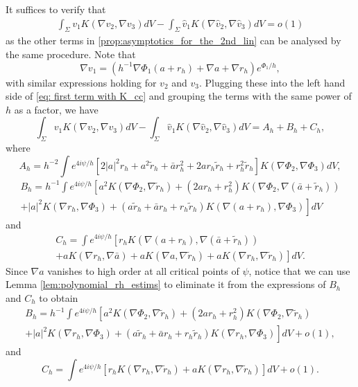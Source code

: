 \documentclass[12pt]{amsart}
\theoremstyle{definition}
\theoremstyle{remark}
\begin{document}
It suffices to verify that 
\begin{eqnarray}
\label{eq: first term with K_cc}
\int_{\Sigma}v_1K(\nabla v_2, \nabla v_3)d V - \int_{\Sigma}\hat v_1K(\nabla\hat  v_2, \nabla\hat v_3)d V = o(1)
\end{eqnarray}
as the other terms in \eqref{prop:asymptotics_for_the_2nd_lin} can be analysed by the  same procedure. Note that
\begin{equation*}
\nabla v_1=\left(h^{-1}\nabla\Phi_1(a+r_h)+\nabla a+\nabla r_h\right) e^{\Phi_1/h},
\end{equation*}
with similar expressions holding for $v_2$ and $v_3$. Plugging these into the left hand side of \eqref{eq: first term with K_cc} and grouping the terms with the same power of $h$ as a factor, we have
\begin{equation*}
\int_{\Sigma}v_1K(\nabla v_2, \nabla v_3)d V - \int_{\Sigma}\hat v_1K(\nabla\hat  v_2, \nabla\hat v_3)d V=A_h+B_h+C_h,
\end{equation*}
where
\begin{equation*}
A_h=h^{-2}\int e^{4i\psi/h}\left[ 2|a|^2 r_h+a^2\tilde r_h+\bar a r_h^2+2a r_h\tilde r_h+r_h^2\tilde r_h
  \right]K(\nabla\Phi_2,\nabla\Phi_3)d V,
\end{equation*}
\begin{multline*}
B_h=h^{-1}\int e^{4i\psi/h}\left[a^2K(\nabla\Phi_2,\nabla\tilde r_h)+(2ar_h+r_h^2)K(\nabla\Phi_2,\nabla(\bar a+\tilde r_h)) \right.\\
+\left.|a|^2K(\nabla r_h,\nabla\Phi_3)+(a\tilde r_h+\bar a r_h+r_h\tilde r_h)K(\nabla(a+r_h),\nabla\Phi_3)   \right]d V
\end{multline*}
and
\begin{multline*}
C_h=\int e^{4i\psi/h}\left[ r_h K(\nabla(a+r_h),\nabla(\bar a+\tilde r_h))\right.\\ +\left.aK(\nabla r_h,\nabla\bar a)+aK(\nabla a,\nabla\tilde r_h)+aK(\nabla r_h,\nabla\tilde r_h)  \right] dV.
\end{multline*}
Since $\nabla a$  vanishes to high order at all critical points of $\psi$, notice that we can use Lemma \ref{lem:polynomial_rh_estims} to eliminate it from the expressions of $B_h$ and $C_h$ to obtain
\begin{multline*}
B_h=h^{-1}\int e^{4i\psi/h}\left[a^2K(\nabla\Phi_2,\nabla\tilde r_h)+(2ar_h+r_h^2)K(\nabla\Phi_2,\nabla\tilde r_h) \right.\\
+\left.|a|^2K(\nabla r_h,\nabla\Phi_3)+(a\tilde r_h+\bar ar_h+r_h\tilde r_h)K(\nabla r_h,\nabla\Phi_3)   \right]d V+o(1),
\end{multline*}
and
\begin{equation*}
C_h=\int e^{4i\psi/h}\left[ r_h K(\nabla r_h,\nabla \tilde r_h)+aK(\nabla r_h,\nabla\tilde r_h)  \right] dV+o(1).
\end{equation*}
\end{document}
